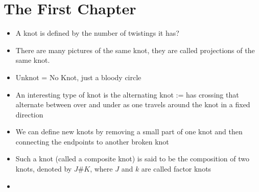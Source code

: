 \chapter{The First Chapter}
\begin{itemize}
	\item A knot is defined by the number of twistings it has?
	\item There are many pictures of the same knot, they are called projections of the same knot.
	\item Unknot = No Knot, just a bloody circle
	\item An interesting type of knot is the alternating knot := has crossing that alternate between over and under as one travels around the knot in a fixed direction
	\item We can define new knots by removing a small part of one knot and then connecting the endpoints to another broken knot
	\item Such a knot (called a composite knot) is said to be the composition of two knots, denoted by $J$#$K$, where $J$ and $k$ are called factor knots
	\item
\end{itemize}